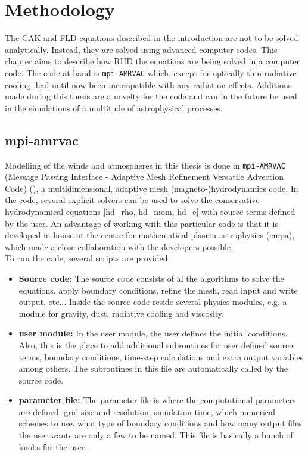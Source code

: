 \chapter{Methodology}
The CAK and FLD equations described in the introduction are not to be solved analytically. Instead, they are solved using advanced computer codes. This chapter aims to describe how RHD the equations are being solved in a computer code. The code at hand is \texttt{mpi-AMRVAC} which, except for optically thin radiative cooling, had until now been incompatible with any radiation effects. Additions made during this thesis are a novelty for the code and can in the future be used in the simulations of a multitude of astrophysical processes.

\section{mpi-amrvac} \label{section: methods amrvac}
Modelling of the winds and atmospheres in this thesis is done in \texttt{mpi-AMRVAC} (Message Passing Interface - Adaptive Mesh Refinement Versatile Advection Code) (\cite{Porth2014}), a multidimensional, adaptive mesh (magneto-)hydrodynamics code. In the code, several explicit solvers can be used to solve the conservative hydrodynamical equations \eqref{hd_rho, hd_mom, hd_e} with source terms defined by the user. An advantage of working with this particular code is that it is developed in house at the centre for mathematical plasma astrophysics (cmpa), which made a close collaboration with the developers possible.\\
To run the code, several scripts are provided:

\begin{itemize}
\item \textbf{Source code:} The source code consists of al the algorithms to solve the equations, apply boundary conditions, refine the mesh, read input and write output, etc... Inside the source code reside several physics modules, e.g. a module for gravity, dust, radiative cooling and viscosity.\\

\item \textbf{user module:} In the user module, the user defines the initial conditions. Also, this is the place to add additional subroutines for user defined source terms, boundary conditions, time-step calculations and extra output variables among others. The subroutines in this file are automatically called by the source code.\\

\item \textbf{parameter file:} The parameter file is where the computational parameters are defined: grid size and resolution, simulation time, which numerical schemes to use, what type of boundary conditions and how many output files the user wants are only a few to be named. This file is basically a bunch of knobs for the user.\\
\end{itemize}


